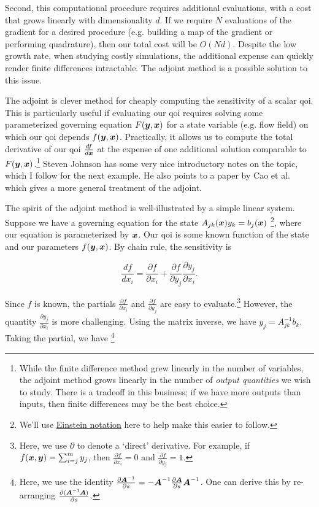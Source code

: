 \documentclass[../primer.tex]{subfiles}
\begin{document}
Second, this computational procedure requires additional evaluations, with a
cost that grows linearly with dimensionality $d$. If we require $N$ evaluations
of the gradient for a desired procedure (e.g. building a map of the gradient or
performing quadrature), then our total cost will be $O(Nd)$. Despite the low
growth rate, when studying costly simulations, the additional expense can
quickly render finite differences intractable. The adjoint method is a possible
solution to this issue.

The adjoint is clever method for cheaply computing the sensitivity of a scalar
qoi. This is particularly useful if evaluating our qoi requires solving some
parameterized governing equation $F(\boldsymbol{y},\boldsymbol{x})$ for a state variable (e.g. flow
field) on which our qoi depends $f(\boldsymbol{y},\boldsymbol{x})$. Practically, it allows us to
compute the total derivative of our qoi $\frac{df}{d\boldsymbol{x}}$ at the expense of one
additional solution comparable to $F(\boldsymbol{y},\boldsymbol{x})$.\footnote{While the finite
  difference method grew linearly in the number of variables, the adjoint method
  grows linearly in the number of \emph{output quantities} we wish to study.
  There is a tradeoff in this business; if we have more outputs than inputs,
  then finite differences may be the best choice.} Steven Johnson
\cite{johnson2012} has some very nice introductory notes on the topic, which I
follow for the next example. He also points to a paper by Cao et
al.\cite{cao2003adjoint} which gives a more general treatment of the adjoint.

The spirit of the adjoint method is well-illustrated by a simple linear system.
Suppose we have a governing equation for the state
$A_{jk}(\boldsymbol{x})y_k=b_j(\boldsymbol{x})$ \footnote{We'll use
  \href{https://en.wikipedia.org/wiki/Einstein_notation}{Einstein notation} here
  to help make this easier to follow.}, where our equation is parameterized by
$\boldsymbol{x}$. Our qoi is some known function of the state and our parameters
$f(\boldsymbol{y},\boldsymbol{x})$. By chain rule, the sensitivity is

\begin{equation}\label{eq:linear-sens}
  \frac{df}{dx_i} = \frac{\partial f}{\partial x_i} %
                  + \frac{\partial f}{\partial y_j}\frac{\partial y_j}{\partial x_i}.
\end{equation}

\noindent Since $f$ is known, the partials $\frac{\partial f}{\partial x_i}$ and
$\frac{\partial f}{\partial y_j}$ are easy to evaluate.\footnote{Here, we use
  $\partial$ to denote a `direct' derivative. For example, if
  $f(\boldsymbol{x},\boldsymbol{y})=\sum_{i=j}^my_j$, then $\frac{\partial f}{\partial x_i}=0$ and
  $\frac{\partial f}{\partial y_j}=1$.} However, the quantity $\frac{\partial
  y_j}{\partial x_i}$ is more challenging. Using the matrix inverse, we have
$y_j=A_{jk}^{-1}b_k$. Taking the partial, we have \footnote{Here, we use the
  identity $\frac{\partial \boldsymbol{A}^{-1}}{\partial s} =-\nobreak
  \boldsymbol{A}^{-1}\frac{\partial \boldsymbol{A}}{\partial s}\boldsymbol{A}^{-1}$. One can derive this by
  re-arranging $\frac{\partial(\boldsymbol{A}^{-1}\boldsymbol{A})}{\partial s}$.}
\end{document}
